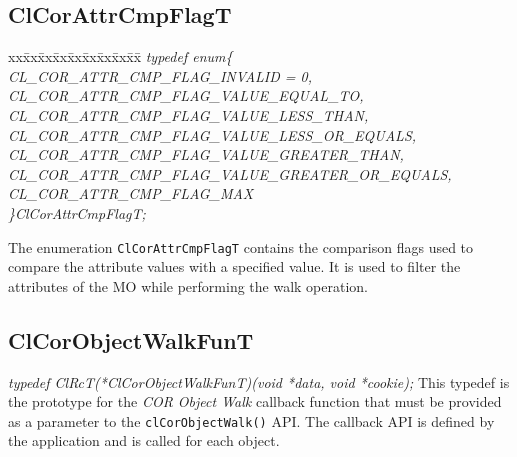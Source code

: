 \begin{flushleft}
\subsection{ClCorAttrCmpFlagT}
\begin{tabbing}
xx\=xx\=xx\=xx\=xx\=xx\=xx\=xx\=xx\=\kill
\textit{typedef enum\{}\\
\>\>\>\>\textit{CL\_COR\_ATTR\_CMP\_FLAG\_INVALID = 0,}\\
\>\>\>\>\textit{CL\_COR\_ATTR\_CMP\_FLAG\_VALUE\_EQUAL\_TO,}\\
              \>\>\>\>\textit{CL\_COR\_ATTR\_CMP\_FLAG\_VALUE\_LESS\_THAN,}\\
              \>\>\>\>\textit{CL\_COR\_ATTR\_CMP\_FLAG\_VALUE\_LESS\_OR\_EQUALS,}\\
              \>\>\>\>\textit{CL\_COR\_ATTR\_CMP\_FLAG\_VALUE\_GREATER\_THAN,}\\
              \>\>\>\>\textit{CL\_COR\_ATTR\_CMP\_FLAG\_VALUE\_GREATER\_OR\_EQUALS,}\\
              \>\>\>\>\textit{CL\_COR\_ATTR\_CMP\_FLAG\_MAX}\\
       \>\>\>\>\textit{\}ClCorAttrCmpFlagT;}\end{tabbing}
   The enumeration {\tt{ClCorAttrCmpFlagT}} contains the comparison flags used to compare the attribute values with a specified value.
It is used to filter the attributes of the MO while performing the walk operation.


\subsection{ClCorObjectWalkFunT}
\textit{typedef ClRcT(*ClCorObjectWalkFunT)(void *data, void *cookie);}
\newline
\newline
This typedef is the prototype for the \textit{COR Object Walk} callback function that must be provided as a parameter to the 
{\tt{clCorObjectWalk()}} API. The callback API is defined by the application and is called for each object.




\end{flushleft}
